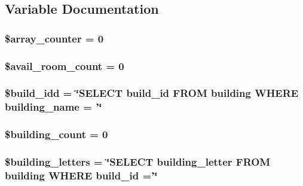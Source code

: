\subsection{\-Variable \-Documentation}
\hypertarget{index_8php_a23bfd2b4e40b92a4e1df61a3752528d5}{
\subsubsection[{\$array\-\_\-counter}]{\setlength{\rightskip}{0pt plus 5cm}\$array\-\_\-counter = 0}}\label{index_8php_a23bfd2b4e40b92a4e1df61a3752528d5}
\hypertarget{index_8php_a02eb1848bf44216bfff32490e891d18a}{
\subsubsection[{\$avail\-\_\-room\-\_\-count}]{\setlength{\rightskip}{0pt plus 5cm}\$avail\-\_\-room\-\_\-count = 0}}\label{index_8php_a02eb1848bf44216bfff32490e891d18a}
\hypertarget{index_8php_a6671599aee303444a6ccd2d2226630dd}{
\subsubsection[{\$build\-\_\-idd}]{\setlength{\rightskip}{0pt plus 5cm}\$build\-\_\-idd = \char`\"{}\-S\-E\-L\-E\-C\-T build\-\_\-id \-F\-R\-O\-M building \-W\-H\-E\-R\-E building\-\_\-name = '\char`\"{}}}\label{index_8php_a6671599aee303444a6ccd2d2226630dd}
\hypertarget{index_8php_abcc551d7bb78645ca485dd1332f3637a}{
\subsubsection[{\$building\-\_\-count}]{\setlength{\rightskip}{0pt plus 5cm}\$building\-\_\-count = 0}}\label{index_8php_abcc551d7bb78645ca485dd1332f3637a}
\hypertarget{index_8php_ab7c3ef21f41bcddbed5d1f3b591342da}{
\subsubsection[{\$building\-\_\-letters}]{\setlength{\rightskip}{0pt plus 5cm}\$building\-\_\-letters = \char`\"{}\-S\-E\-L\-E\-C\-T building\-\_\-letter \-F\-R\-O\-M building \-W\-H\-E\-R\-E build\-\_\-id ='\char`\"{}}}\label{index_8php_ab7c3ef21f41bcddbed5d1f3b591342da}
